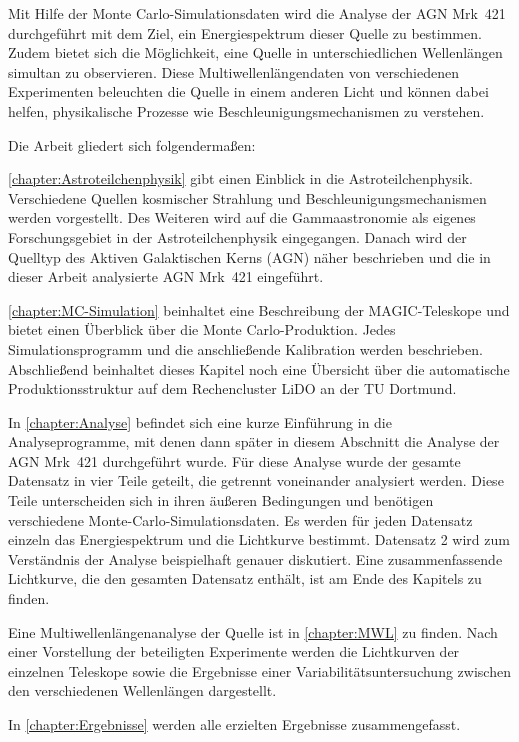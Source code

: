 Mit Hilfe der Monte Carlo-Simulationsdaten wird die Analyse der AGN Mrk~421 durchgeführt mit dem Ziel, ein Energiespektrum dieser Quelle zu bestimmen.
Zudem bietet sich die Möglichkeit, eine Quelle in unterschiedlichen Wellenlängen simultan zu observieren.
Diese Multiwellenlängendaten von verschiedenen Experimenten beleuchten die Quelle in einem anderen Licht und können dabei helfen, physikalische Prozesse wie Beschleunigungsmechanismen zu verstehen.\newline

Die Arbeit gliedert sich folgendermaßen:

\autoref{chapter:Astroteilchenphysik} gibt einen Einblick in die Astroteilchenphysik. 
Verschiedene Quellen kosmischer Strahlung und Beschleunigungsmechanismen werden vorgestellt. 
Des Weiteren wird auf die Gammaastronomie als eigenes Forschungsgebiet in der Astroteilchenphysik eingegangen. 
Danach wird der Quelltyp des Aktiven Galaktischen Kerns (AGN) näher beschrieben und die in dieser Arbeit analysierte AGN Mrk~421 eingeführt.

\autoref{chapter:MC-Simulation} beinhaltet eine Beschreibung der MAGIC-Teleskope und bietet einen Überblick über die Monte Carlo-Produktion.
Jedes Simulationsprogramm und die anschließende Kalibration werden beschrieben.
Abschließend beinhaltet dieses Kapitel noch eine Übersicht über die automatische Produktionsstruktur auf dem Rechencluster LiDO an der TU Dortmund.

In \autoref{chapter:Analyse} befindet sich eine kurze Einführung in die Analyseprogramme, mit denen dann später in diesem Abschnitt die Analyse der AGN Mrk~421 durchgeführt wurde.
Für diese Analyse wurde der gesamte Datensatz in vier Teile geteilt, die getrennt voneinander analysiert werden.
Diese Teile unterscheiden sich in ihren äußeren Bedingungen und benötigen verschiedene Monte-Carlo-Simulationsdaten.
Es werden für jeden Datensatz einzeln das Energiespektrum und die Lichtkurve bestimmt.
Datensatz 2 wird zum Verständnis der Analyse beispielhaft genauer diskutiert.
Eine zusammenfassende Lichtkurve, die den gesamten Datensatz enthält, ist am Ende des Kapitels zu finden.

Eine Multiwellenlängenanalyse der Quelle ist in \autoref{chapter:MWL} zu finden.
Nach einer Vorstellung der beteiligten Experimente werden die Lichtkurven der einzelnen Teleskope sowie die Ergebnisse einer Variabilitätsuntersuchung zwischen den verschiedenen Wellenlängen  dargestellt.

In \autoref{chapter:Ergebnisse} werden alle erzielten Ergebnisse zusammengefasst.